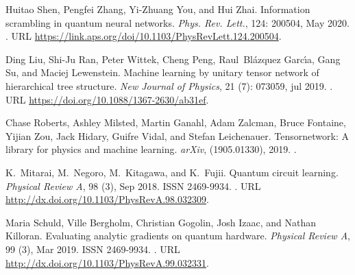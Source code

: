 \documentclass[letterpaper,preprintnumbers,preprint,aps,accepted=2022-05-26]{quantumarticle}
\begin{document}
\begin{thebibliography}{39}
Huitao Shen, Pengfei Zhang, Yi-Zhuang You, and Hui Zhai.
\newblock Information scrambling in quantum neural networks.
\newblock \emph{Phys. Rev. Lett.}, 124: 200504, May 2020.
\newblock {}.
\newblock URL \url{https://link.aps.org/doi/10.1103/PhysRevLett.124.200504}.

Ding Liu, Shi-Ju Ran, Peter Wittek, Cheng Peng, Raul~Bl{\'{a}}zquez
  Garc{\'{\i}}a, Gang Su, and Maciej Lewenstein.
\newblock Machine learning by unitary tensor network of hierarchical tree
  structure.
\newblock \emph{New Journal of Physics}, 21 (7): 073059, jul
  2019.
\newblock {}.
\newblock URL \url{https://doi.org/10.1088/1367-2630/ab31ef}.

Chase Roberts, Ashley Milsted, Martin Ganahl, Adam Zalcman, Bruce Fontaine,
  Yijian Zou, Jack Hidary, Guifre Vidal, and Stefan Leichenauer.
\newblock Tensornetwork: A library for physics and machine learning.
\newblock \emph{arXiv},  (1905.01330), 2019.
\newblock {}.

K.~Mitarai, M.~Negoro, M.~Kitagawa, and K.~Fujii.
\newblock Quantum circuit learning.
\newblock \emph{Physical Review A}, 98 (3), Sep 2018.
\newblock ISSN 2469-9934.
\newblock {}.
\newblock URL \url{http://dx.doi.org/10.1103/PhysRevA.98.032309}.

Maria Schuld, Ville Bergholm, Christian Gogolin, Josh Izaac, and Nathan
  Killoran.
\newblock Evaluating analytic gradients on quantum hardware.
\newblock \emph{Physical Review A}, 99 (3), Mar 2019.
\newblock ISSN 2469-9934.
\newblock {}.
\newblock URL \url{http://dx.doi.org/10.1103/PhysRevA.99.032331}.

\end{thebibliography}

\appendix

\end{document}
